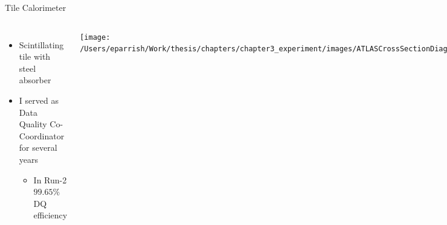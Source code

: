 \documentclass[aspectratio=169,xcolor=table]{beamer}
\begin{document}
    \begin{frame}[t]{Tile Calorimeter}
     \begin{columns}[t]
        \begin{itemize}
          \item Scintillating tile with steel absorber
          \item I served as Data Quality Co-Coordinator for several years
          \begin{itemize}
            \item In Run-2 $99.65\%$ DQ efficiency \cite{DQ-Run2}
          \end{itemize}
        \end{itemize}

      \centering
      \vspace{-.2cm}
      \begin{columns}
      \texttt{[image: /Users/eparrish/Work/thesis/chapters/chapter3\_experiment/images/ATLASCrossSectionDiagram.png]}
        \begin{figure}
          \begin{columns}
            \centering
            \texttt{[image: /Users/eparrish/Work/thesis/chapters/chapter3\_experiment/images/TileModuleCrossSection.png]}
            \vspace{1cm}
            \caption{\tiny \cite{ATLAS-tile}}
          \end{columns}
        \end{figure}
      \end{columns}



\end{columns}
\end{frame}
\end{document}
